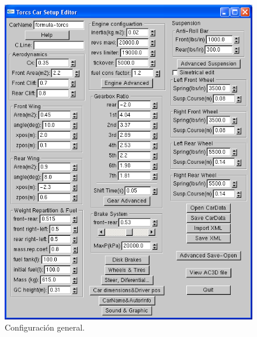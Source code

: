 \begin{figure}[h]
\begin{minipage}[t]{0.5\linewidth}
\centering
\includegraphics[scale= 0.45,type=png,ext=.png,read=.png]{figures/c1}
\caption{Configuración general.}
\label{fig:c1}
\end{minipage}
\hspace{0.5cm}
\begin{minipage}[t]{0.5\linewidth}
\centering

\end{minipage}
\end{figure}

